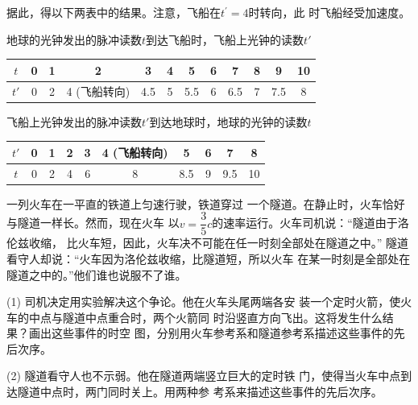 据此，得以下两表中的结果。注意，飞船在$  t ^ { \prime } = 4   $时转向，此
时飞船经受加速度。
\vspace{0.8em}
\begin{tablex}[!h]
    \caption{地球的光钟发出的脉冲读数$ t $到达飞船时，飞船上光钟的读数$ t' $}
    \label{tab:11.01}
    \centering
    \begin{tabularx}{\linewidth}{C*{2}{|C}|c*{8}{|C}}
        \toprule
        $t$  & 0 & 1 & 2                      & 3   & 4 & 5   & 6 & 7   & 8 & 9   & 10 \\
        \midrule
        $t'$ & 0 & 2 & 4 (飞船转向) & 4.5 & 5 & 5.5 & 6 & 6.5 & 7 & 7.5 & 8 \\
        \bottomrule
    \end{tabularx}
\end{tablex}
\vspace{0.8em}
\begin{tablex}[!h]
    \caption{飞船上光钟发出的脉冲读数$ t' $到达地球时，地球的光钟的读数$ t $}
    \label{tab:11.02}
    \centering
    \begin{tabularx}{\linewidth}{C|C|C|C|C|c|C|C|C|C}
        \toprule
        $t'$  & 0 & 1 & 2 & 3 & 4 (飞船转向) & 5   & 6 & 7   & 8  \\
        \midrule
        $t$   & 0 & 2 & 4 & 6 & 8           & 8.5 & 9 & 9.5 & 10  \\
        \bottomrule
    \end{tabularx}
\end{tablex}
\vspace{0.8em}

\example 一列火车在一平直的铁道上匀速行驶，铁道穿过
一个隧道。在静止时，火车恰好与隧道一样长。然而，现在火车
以$ v = \dfrac { 3 } { 5 } c  $的速率运行。火车司机说：“隧道由于洛伦兹收缩，
比火车短，因此，火车决不可能在任一时刻全部处在隧道之中。”
隧道看守人却说：“火车因为洛伦兹收缩，比隧道短，所以火车
在某一时刻是全部处在隧道之中的。”他们谁也说服不了谁。

(1) 司机决定用实验解决这个争论。他在火车头尾两端各安
装一个定时火箭，使火车的中点与隧道中点重合时，两个火箭同
时沿竖直方向飞出。这将发生什么结果？画出这些事件的时空
图，分别用火车参考系和隧道参考系描述这些事件的先后次序。

(2) 隧道看守人也不示弱。他在隧道两端竖立巨大的定时铁
门，使得当火车中点到达隧道中点时，两门同时关上。用两种参
考系来描述这些事件的先后次序。

